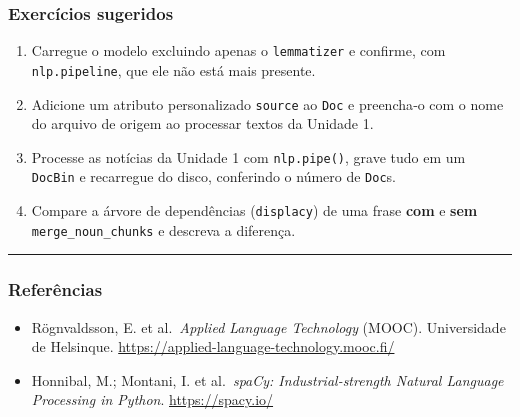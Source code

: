 \documentclass[
  brazilian,
  11pt,
]{article}
\providecommand{\tightlist}{%
  \setlength{\itemsep}{0pt}\setlength{\parskip}{0pt}}
\let\oldtexttt\texttt
\renewcommand{\texttt}[1]{{\color{inlink}\oldtexttt{#1}}}
\begin{document}
\subsubsection{Exercícios sugeridos}\label{exercuxedcios-sugeridos}

\begin{enumerate}
\def\labelenumi{\arabic{enumi}.}
\tightlist
\item
  Carregue o modelo excluindo apenas o \texttt{lemmatizer} e confirme,
  com \texttt{nlp.pipeline}, que ele não está mais presente.
\item
  Adicione um atributo personalizado \texttt{source} ao \texttt{Doc} e
  preencha‑o com o nome do arquivo de origem ao processar textos da
  Unidade 1.
\item
  Processe as notícias da Unidade 1 com \texttt{nlp.pipe()}, grave tudo
  em um \texttt{DocBin} e recarregue do disco, conferindo o número de
  \texttt{Doc}s.
\item
  Compare a árvore de dependências (\texttt{displacy}) de uma frase
  \textbf{com} e \textbf{sem} \texttt{merge\_noun\_chunks} e descreva a
  diferença.
\end{enumerate}

\begin{center}\rule{0.5\linewidth}{0.5pt}\end{center}

\subsubsection{Referências}\label{referuxeancias}

\begin{itemize}
\tightlist
\item
  Rögnvaldsson, E. et al.~\emph{Applied Language Technology} (MOOC).
  Universidade de Helsinque.
  \url{https://applied-language-technology.mooc.fi/}
\item
  Honnibal, M.; Montani, I. et al.~\emph{spaCy: Industrial-strength
  Natural Language Processing in Python}. \url{https://spacy.io/}
\end{itemize}
\end{document}
